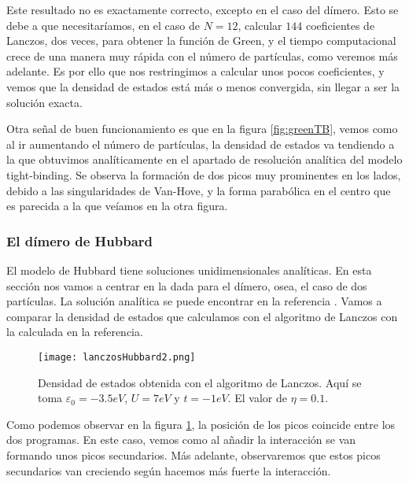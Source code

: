 \documentclass[12pt,twoside]{article}
\begin{document}
Este resultado no es exactamente correcto, excepto en el caso del dímero. Esto se debe a que necesitaríamos, en el caso de $N = 12$, calcular $144$ coeficientes de Lanczos, dos veces, para obtener la función de Green, y el tiempo computacional crece de una manera muy rápida con el número de partículas, como veremos más adelante. Es por ello que nos restringimos a calcular unos pocos coeficientes, y vemos que la densidad de estados está más o menos convergida, sin llegar a ser la solución exacta.

Otra señal de buen funcionamiento es que en la figura \ref{fig:greenTB}, vemos como al ir aumentando el número de partículas, la densidad de estados va tendiendo a la que obtuvimos analíticamente en el apartado de resolución analítica del modelo tight-binding. Se observa la formación de dos picos muy prominentes en los lados, debido a las singularidades de Van-Hove, y la forma parabólica en el centro que es parecida a la que veíamos en la otra figura.
\subsubsection{El dímero de Hubbard}

El modelo de Hubbard tiene soluciones unidimensionales analíticas. En esta sección nos vamos a centrar en la dada para el dímero, osea, el caso de dos partículas. La solución analítica se puede encontrar en la referencia \cite{mironov2025dimerhubbardmodelexact}. Vamos a comparar la densidad de estados que calculamos con el algoritmo de Lanczos con la calculada en la referencia.
\begin{figure}[h!]
  \begin{center}
    \texttt{[image: lanczosHubbard2.png]}
  \end{center}
  \caption{Densidad de estados obtenida con el algoritmo de Lanczos. Aquí se toma $\varepsilon_0 = -3.5 eV$, $U = 7 eV$ y $t = -1 eV$. El valor de $\eta = 0.1$.}
  \label{fig:lancvref}
\end{figure}

Como podemos observar en la figura \ref{fig:lancvref}, la posición de los picos coincide entre los dos programas. En este caso, vemos como al añadir la interacción se van formando unos picos secundarios. Más adelante, observaremos que estos picos secundarios van creciendo según hacemos más fuerte la interacción.
\end{document}
